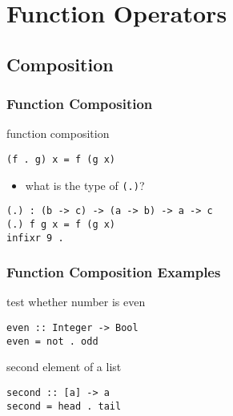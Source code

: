 \documentclass[dvipsnames]{beamer}
\theoremstyle{plain}
\begin{document}
\section{Function Operators}

\subsection{Composition}

\begin{frame}[fragile]
  \frametitle{Function Composition}

  \begin{block}{function composition}
    \begin{lstlisting}
(f . g) x = f (g x)
    \end{lstlisting}
  \end{block}

  \pause
  \begin{itemize}
    \item what is the type of \lstinline|(.)|?
  \end{itemize}

  \begin{exampleblock}{}
    \begin{lstlisting}
(.) : (b -> c) -> (a -> b) -> a -> c
(.) f g x = f (g x)
infixr 9 .
    \end{lstlisting}
  \end{exampleblock}
\end{frame}

\begin{frame}[fragile]
  \frametitle{Function Composition Examples}

  \begin{exampleblock}{test whether number is even}
    \begin{lstlisting}[deletekeywords=even]
even :: Integer -> Bool
even = not . odd
    \end{lstlisting}
  \end{exampleblock}

  \pause
  \begin{exampleblock}{second element of a list}
    \begin{lstlisting}
second :: [a] -> a
second = head . tail
    \end{lstlisting}
  \end{exampleblock}
\end{frame}
\end{document}
